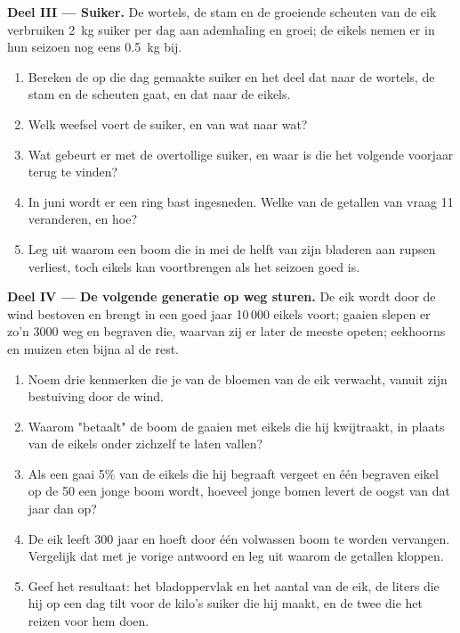 \begin{problem}
\medskip
\noindent\textbf{Deel III --- Suiker.}
De wortels, de stam en de groeiende scheuten van de eik verbruiken
\qty{2}{kg} suiker per dag aan ademhaling en groei; de eikels nemen er in
hun seizoen nog eens \qty{0.5}{kg} bij.
\begin{enumerate}[resume]
  \item Bereken de op die dag gemaakte suiker en het deel dat naar de
        wortels, de stam en de scheuten gaat, en dat naar de eikels.
  \item Welk weefsel voert de suiker, en van wat naar wat?
  \item Wat gebeurt er met de overtollige suiker, en waar is die het
        volgende voorjaar terug te vinden?
  \item In juni wordt er een ring bast ingesneden. Welke van de getallen
        van vraag 11 veranderen, en hoe?
  \item Leg uit waarom een boom die in mei de helft van zijn bladeren aan
        rupsen verliest, toch eikels kan voortbrengen als het seizoen
        goed is.
\end{enumerate}

\medskip
\noindent\textbf{Deel IV --- De volgende generatie op weg sturen.}
De eik wordt door de wind bestoven en brengt in een goed jaar 10\,000
eikels voort; gaaien slepen er zo'n 3000 weg en begraven die, waarvan zij
er later de meeste opeten; eekhoorns en muizen eten bijna al de rest.
\begin{enumerate}[resume]
  \item Noem drie kenmerken die je van de bloemen van de eik verwacht,
        vanuit zijn bestuiving door de wind.
  \item Waarom "betaalt" de boom de gaaien met eikels die hij kwijtraakt,
        in plaats van de eikels onder zichzelf te laten vallen?
  \item Als een gaai 5\% van de eikels die hij begraaft vergeet en één
        begraven eikel op de 50 een jonge boom wordt, hoeveel jonge bomen
        levert de oogst van dat jaar dan op?
  \item De eik leeft 300 jaar en hoeft door één volwassen boom te worden
        vervangen. Vergelijk dat met je vorige antwoord en leg uit waarom
        de getallen kloppen.
  \item Geef het resultaat: het bladoppervlak en het aantal 
        van de eik, de liters die hij op een dag tilt voor de kilo's
        suiker die hij maakt, en de twee die het reizen voor hem
        doen.
\end{enumerate}
\end{problem}
